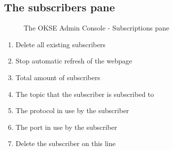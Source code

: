 \subsection{The subscribers pane}
\begin{center}
  \begin{figure}[ht!]
    \caption{The OKSE Admin Console - Subscriptions pane} 
    \label{fig:OKSE Admin Console - Subscriptions pane}
  \end{figure}
\end{center}
\begin{enumerate}
\item Delete all existing subscribers
\item Stop automatic refresh of the webpage
\item Total amount of subscribers
\item The topic that the subscriber is subscribed to
\item The protocol in use by the subscriber
\item The port in use by the subscriber
\item Delete the subscriber on this line
\end{enumerate}

\clearpage

